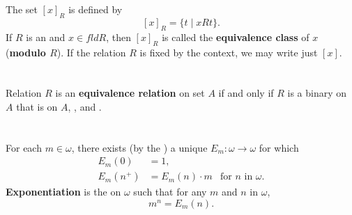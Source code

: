 \documentclass{report}
\begin{document}
\section{}%

The set $[x]_R$ is defined by $$[x]_R = \{t \mid xRt\}.$$
If $R$ is an  and $x \in fld R$, then $[x]_R$
  is called the \textbf{equivalence class} of $x$ (\textbf{modulo $R$}).
If the relation $R$ is fixed by the context, we may write just $[x]$.

\begin{definition}


\end{definition}

\section{}%

Relation $R$ is an \textbf{equivalence relation} on set $A$ if and only if
  $R$ is a binary  on $A$ that is 
  on $A$, , and .

\begin{definition}


\end{definition}

\section{}%

For each $m \in \omega$, there exists (by the
  ) a unique
   $E_m \colon \omega \rightarrow \omega$ for which
  \begin{align*}
    E_m(0) & = 1, \\
    E_m(n^+) & = E_m(n) \cdot m & \text{for } n \text{ in } \omega.
  \end{align*}
\textbf{Exponentiation} is the  on $\omega$
  such that for any $m$ and $n$ in $\omega$, $$m^n = E_m(n).$$
\end{document}
